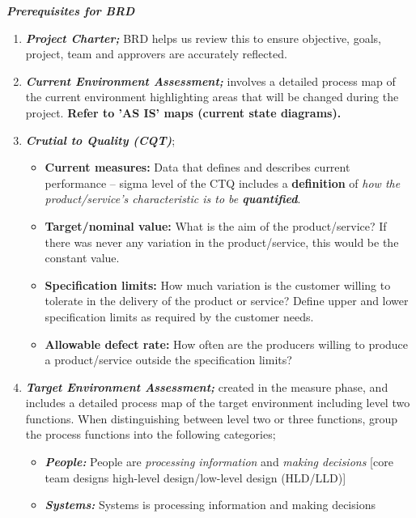 \documentclass{article}
\begin{document}
{\hspace{-0.66cm} \textbf{\textit{Prerequisites for BRD}} 

\begin{enumerate}
    \item \textbf{\textit{Project Charter;}} BRD helps us review this to ensure objective, goals, project, team and approvers are accurately reflected. 
    \item \textbf{\textit{Current Environment Assessment;}} involves a detailed process map of the current environment highlighting areas that will be changed during the project. \textbf{Refer to 'AS IS' maps (current state diagrams).} 
    \item \textbf{\textit{Crutial to Quality (CQT)}}; 
    \begin{itemize}
        \item \textbf{Current measures:} Data that defines and describes current performance – sigma level of the CTQ includes a \textbf{definition} of \textit{how the product/service’s characteristic is to be \textbf{quantified}}.
        \item \textbf{Target/nominal value:} What is the aim of the product/service? If there was never any variation in the product/service, this would be the constant value.
        \item \textbf{Specification limits:} How much variation is the customer willing to tolerate in the delivery of the product or service? Define upper and lower specification limits as required by the customer needs.
        \item \textbf{Allowable defect rate:} How often are the producers willing to produce a product/service outside the specification limits?
    \end{itemize}
    \item \textbf{\textit{Target Environment Assessment;}} created in the measure phase, and includes a detailed process map of the target environment including level two functions. When distinguishing between level two or three functions, group the process functions into the following categories;
    \begin{itemize}
        \item \textbf{\textit{People:}} People are \textit{processing information} and \textit{making decisions} [core team designs high-level design/low-level design (HLD/LLD)]
        \item \textbf{\textit{Systems:}} Systems is processing information and making decisions
    \end{itemize}
\end{enumerate}

}
\end{document}

